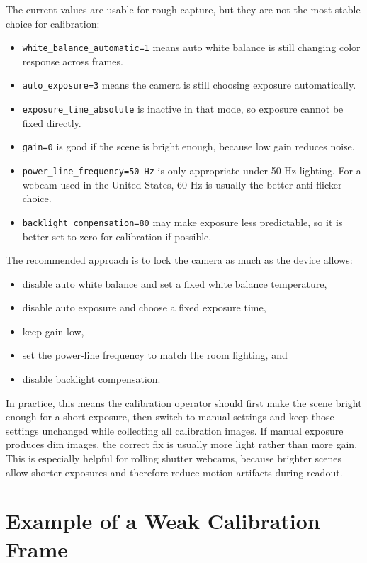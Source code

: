 \documentclass[11pt]{article}
\begin{document}
The current values are usable for rough capture, but they are not the most
stable choice for calibration:

\begin{itemize}
\item \texttt{white\_balance\_automatic=1} means auto white balance is still
      changing color response across frames.
\item \texttt{auto\_exposure=3} means the camera is still choosing exposure
      automatically.
\item \texttt{exposure\_time\_absolute} is inactive in that mode, so exposure
      cannot be fixed directly.
\item \texttt{gain=0} is good if the scene is bright enough, because low gain
      reduces noise.
\item \texttt{power\_line\_frequency=50 Hz} is only appropriate under 50 Hz
      lighting. For a webcam used in the United States, 60 Hz is usually the
      better anti-flicker choice.
\item \texttt{backlight\_compensation=80} may make exposure less predictable,
      so it is better set to zero for calibration if possible.
\end{itemize}

The recommended approach is to lock the camera as much as the device allows:

\begin{itemize}
\item disable auto white balance and set a fixed white balance temperature,
\item disable auto exposure and choose a fixed exposure time,
\item keep gain low,
\item set the power-line frequency to match the room lighting, and
\item disable backlight compensation.
\end{itemize}

In practice, this means the calibration operator should first make the scene
bright enough for a short exposure, then switch to manual settings and keep
those settings unchanged while collecting all calibration images. If manual
exposure produces dim images, the correct fix is usually more light rather
than more gain. This is especially helpful for rolling shutter webcams,
because brighter scenes allow shorter exposures and therefore reduce motion
artifacts during readout.

\section{Example of a Weak Calibration Frame}
\end{document}

